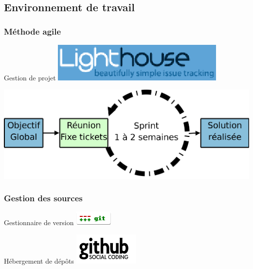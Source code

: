 \subsection{Environnement de travail}
\begin{frame}\frametitle{Méthode agile}
\centering
\begin{minipage}[c]{.3\linewidth}
	\begin{beamerboxesrounded}[shadow=true]{Gestion de projet}
		\includegraphics[width=\linewidth]{../image/lighthouseLogo.png}
	\end{beamerboxesrounded}
\end{minipage}
\vfill
\includegraphics[width=1\linewidth]{../image/agileDev.png}
\end{frame}
\begin{frame}\frametitle{Gestion des sources}
\begin{centering}
	\begin{minipage}[c]{.6\linewidth}
		\begin{beamerboxesrounded}[shadow=true,center]{Gestionnaire de version}
			\centering
			\includegraphics[width=.4\linewidth]{../image/gitLogo.png}\hfil
		\end{beamerboxesrounded}
	\end{minipage}
	\vfill
	\begin{minipage}[c]{.6\linewidth}
		\begin{beamerboxesrounded}[shadow=true,center]{Hébergement de dépôts}
			\centering
			\includegraphics[width=.3\linewidth]{../image/githubLogo.png}
		\end{beamerboxesrounded}
	\end{minipage}
	\vfill
\end{centering}
\end{frame}
